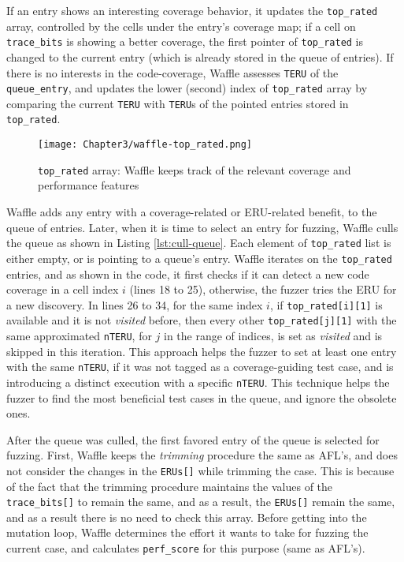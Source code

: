 If an entry shows an interesting coverage behavior, it updates the \texttt{top\_rated} array, controlled by the cells under the entry's coverage map; if a cell on \texttt{trace\_bits} is showing a better coverage, the first pointer of \texttt{top\_rated} is changed to the current entry (which is already stored in the queue of entries). If there is no interests in the code-coverage, Waffle assesses \texttt{TERU} of the \texttt{queue\_entry}, and updates the lower (second) index of \texttt{top\_rated} array by comparing the current \texttt{TERU} with \texttt{TERU}s of the pointed entries stored in \texttt{top\_rated}.

\begin{figure}[!b]
  \texttt{[image: Chapter3/waffle-top\_rated.png]}
  \centering
  \caption{\texttt{top\_rated} array: Waffle keeps track of the relevant coverage and performance features}
  \label{fig:waffle-top_rated}
\end{figure}


Waffle adds any entry with a coverage-related or ERU-related benefit, to the queue of entries. Later, when it is time to select an entry for fuzzing, Waffle culls the queue as shown in Listing \ref{lst:cull-queue}. Each element of \texttt{top\_rated} list is either empty, or is pointing to a queue's entry. Waffle iterates on the \texttt{top\_rated} entries, and as shown in the code, it first checks if it can detect a new code coverage in a cell index $i$ (lines 18 to 25), otherwise, the fuzzer tries the ERU for a new discovery. In lines 26 to 34, for the same index $i$, if \texttt{top\_rated[i][1]} is available and it is not \textit{visited} before, then every other \texttt{top\_rated[j][1]} with the same approximated \texttt{nTERU}, for $j$ in the range of indices, is set as \textit{visited} and is skipped in this iteration. This approach helps the fuzzer to set at least one entry with the same \texttt{nTERU}, if it was not tagged as a coverage-guiding test case, and is introducing a distinct execution with a specific \texttt{nTERU}. This technique helps the fuzzer to find the most beneficial test cases in the queue, and ignore the obsolete ones.




After the queue was culled, the first favored entry of the queue is selected for fuzzing. First, Waffle keeps the \textit{trimming} procedure the same as AFL's, and does not consider the changes in the \texttt{ERUs[]} while trimming the case. This is because of the fact that the trimming procedure maintains the values of the \texttt{trace\_bits[]} to remain the same, and as a result, the \texttt{ERUs[]} remain the same, and as a result there is no need to check this array. Before getting into the mutation loop, Waffle determines the effort it wants to take for fuzzing the current case, and calculates \texttt{perf\_score} for this purpose (same as AFL's).

